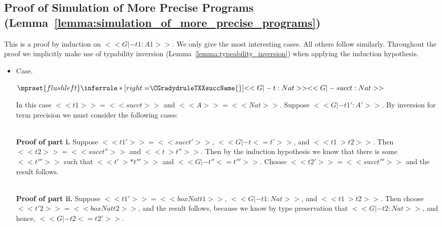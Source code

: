 \subsection{Proof of Simulation of More Precise Programs (Lemma~\ref{lemma:simulation_of_more_precise_programs})}
\label{subsec:proof_of_simulation_of_more_precise_programs_lemma:simulation_of_more_precise_programs}
This is a proof by induction on $<<G |- t1 : A1>>$.  We only give the
most interesting cases.  All others follow similarly.  Throughout the
proof we implicitly make use of typability inversion
(Lemma~\ref{lemma:typeability_inversion}) when applying the induction
hypothesis.

\begin{itemize}
\item[] Case.\ \\ 
  \begin{center}
    \begin{math}
      $$\mprset{flushleft}
      \inferrule* [right=$\CGradydruleTXXsuccName{}$] {
        <<G |- t : Nat>>
      }{<<G |- succ t : Nat>>}
    \end{math}
  \end{center}
  In this case $<<t1>> = <<succ t>>$ and $<<A>> = <<Nat>>$.  Suppose $<<G |- t1' : A'>>$.
  By inversion for term precision we must consider the following cases:

  \ \\
  \noindent
  \textbf{Proof of part i.}  Suppose $<<t1'>> = <<succ t'>>$, $<<G |- t <= t'>>$, and $<<t1 ~> t2>>$.
  Then $<<t2>> = <<succ t''>>$ and $<<t ~> t''>>$.  Then by the induction hypothesis
  we know that there is some $<<t'''>>$ such that $<<t' ~>* t'''>>$ and $<<G |- t'' <= t'''>>$.  Choose
  $<<t2'>> = <<succ t'''>>$ and the result follows.

  \ \\
  \noindent
  \textbf{Proof of part ii.} Suppose $<<t1'>> = <<box Nat t1>>$, $<<G |- t1 : Nat>>$, and $<<t1 ~> t2>>$.
  Then choose $<<t'2>> = <<box Nat t2>>$, and the result follows, because we know by type preservation
  that $<<G |- t2 : Nat>>$, and hence, $<<G |- t2 <= t2'>>$.


\end{itemize}
